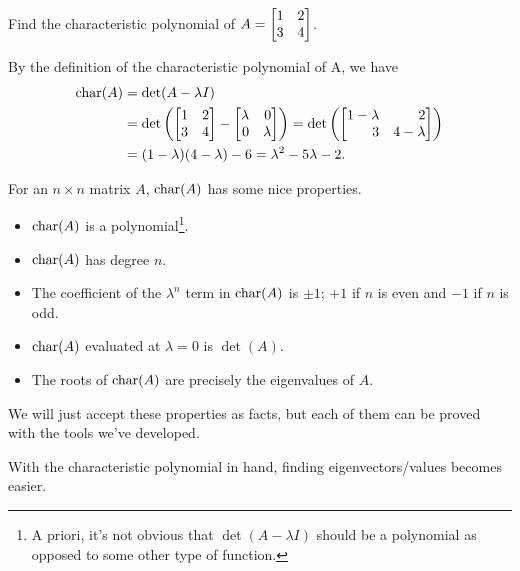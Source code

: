 \begin{example}
	Find the characteristic polynomial of $A=\mat{1&2\\3&4}$.
	
	By the definition of the characteristic polynomial of A, we have
	\begin{align*}
	    \Char(A) &=\det(A-\lambda I)\\
	            &=\det\left(\mat{1&2\\3&4}-\mat{\lambda&0\\0&\lambda}\right)=\det\left(\mat{1-\lambda&2\\3&4-\lambda}\right)\\
	            &=(1-\lambda)(4-\lambda) - 6=\lambda^2 -5\lambda-2.
	\end{align*}
\end{example}
For an $n\times n$ matrix $A$, $\operatorname{char}(A)$ has some nice properties.
\begin{itemize}
	\item $\operatorname{char}(A)$ is a polynomial\footnote{ A priori, it's not obvious that $\det(A-\lambda I)$
	should be a polynomial as opposed to some other type of function.}.
	\item $\operatorname{char}(A)$ has degree $n$.
	\item The coefficient of the $\lambda^n$ term in $\operatorname{char}(A)$ is $\pm1$; $+1$ if $n$ is even and $-1$ if $n$ is odd.
	\item $\operatorname{char}(A)$ evaluated at $\lambda = 0$ is $\det(A)$.
	\item The roots of $\operatorname{char}(A)$ are precisely the eigenvalues of $A$.
\end{itemize}
We will just accept these properties as facts, but each of them can be proved with the tools we've developed.


With the characteristic polynomial in hand, finding eigenvectors/values becomes easier.

